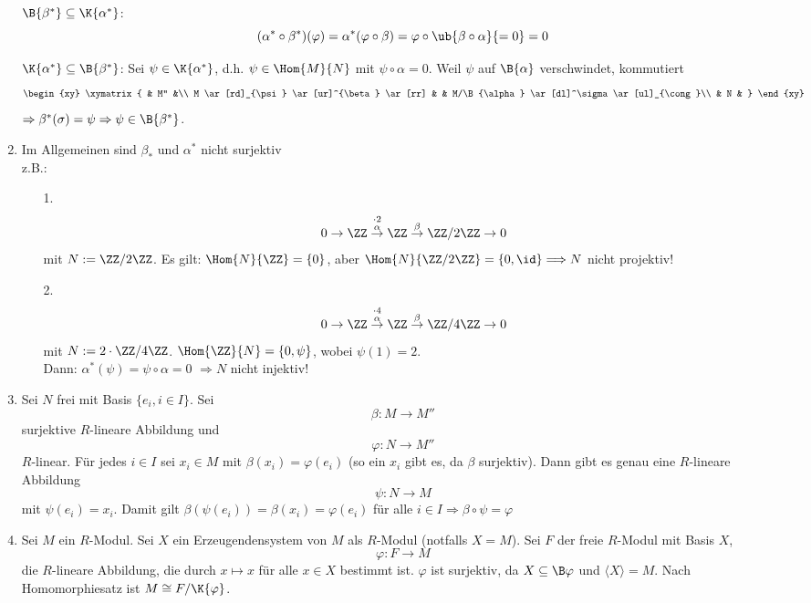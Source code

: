 \begin{Bew}
\begin{enumerate}
	  $\B{\beta^*} \subseteq \K{\alpha^*}$:
	  \[
	  (\alpha^* \circ 
	  \beta^*)(\varphi)= \alpha^*(\varphi\circ \beta)=\varphi \circ
	  \ub{\beta \circ \alpha}{=0}=0
	  \]

	  $\K{\alpha^*}\subseteq\B{\beta^*}$: Sei $\psi \in 
	  \K{\alpha^*}$, d.h. $\psi \in \Hom{M}{N}$ mit $\psi
	  \circ\alpha=0$.
	  Weil $\psi$ auf $\B{\alpha}$ verschwindet, kommutiert
	  \[
            \begin{xy}
              \xymatrix{
                                 & M'' &\\
                M \ar[rd]_{\psi} \ar[ur]^{\beta} \ar[rr] &     &  M/\B{\alpha}
                \ar[dl]^\sigma \ar[ul]_{\cong}\\
                &  N  & }
            \end{xy}
          \]
		  $\Rightarrow \beta^*(\sigma)= \psi \Rightarrow \psi\in\B{\beta^*}$.
	\item Im Allgemeinen sind $\beta_*$ und $\alpha^*$ nicht surjektiv\\
		z.B.: \begin{enumerate}
		\item[1.]
		\[
		0\rightarrow \ZZ \stackrel{\cdot2}{\stackrel{\alpha}\rightarrow} 
		\ZZ \stackrel\beta\rightarrow \ZZ / 2\ZZ\rightarrow 0
		\]
		mit $N:= \ZZ / 2\ZZ$.
		Es gilt: $\Hom{N}{\ZZ}=\{0\}$, aber
		$\Hom{N}{\ZZ/2\ZZ}=\{0, \id\}  \Longrightarrow  N$ nicht projektiv!
		\item[2.]
		\[
		0\rightarrow \ZZ \stackrel{\cdot4}{\stackrel{\alpha}\rightarrow} \ZZ 
		\stackrel\beta\rightarrow \ZZ / 4\ZZ\rightarrow 0
		\]
		mit $N:= 2\cdot \ZZ / 4\ZZ$.
		$\Hom{\ZZ}{N}= \{0, \psi\}$, wobei $\psi(1)=2$.\\
		Dann: $\alpha^*(\psi)=\psi\circ \alpha = 0$ $\Longrightarrow N$ nicht injektiv!
		\end{enumerate}
      \item Sei $N$ frei mit Basis $\{e_i,i \in I\}$.
            Sei 
            \[
            \beta: M \to M''
            \]
            surjektive $R$-lineare Abbildung und
            \[
            \varphi: N \to M''
            \]
            $R$-linear. Für jedes $i \in I$ sei $x_i \in M$
            mit $\beta(x_i) = \varphi(e_i)$ (so ein $x_i$ gibt es, da $\beta$
            surjektiv). Dann gibt es genau eine $R$-lineare Abbildung
            \[
            \psi: N \to M
            \]
            mit $\psi(e_i) = x_i$. Damit gilt $\beta(\psi(e_i)) =
            \beta(x_i) = \varphi(e_i)$ für alle $i \in I \Rightarrow \beta \circ
            \psi = \varphi$
      \item \label{1.5fBew}
            Sei $M$ ein $R$-Modul. Sei $X$ ein Erzeugendensystem von $M$ als
            $R$-Modul (notfalls $X = M$). Sei $F$ der freie $R$-Modul mit Basis
            $X$,
            \[
            \varphi: F \to M
            \]
            die $R$-lineare Abbildung, die durch $x
            \mapsto x$ für alle $x \in X$ bestimmt ist. $\varphi$ ist surjektiv,
            da $X \subseteq \B\varphi$ und $\langle X \rangle = M$.
            Nach Homomorphiesatz ist $M \cong F/\K{\varphi}$.
  \end{enumerate}
\end{Bew}

